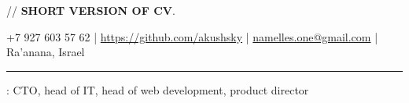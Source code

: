 \documentclass[11pt]{article}
\newif\ifdetailed
\begin{document}
%
\ifdetailed
{\small{// {\textbf{DETAILED VERSION OF CV}}. }}
\else
{\small{// {\textbf{SHORT VERSION OF CV}}. }}
\fi

\vspace{0.5em}

\noindent +7 927 603 57 62    |    \url{https://github.com/akushsky}   |   \href{mailto:namelles.one@gmail.com}{namelles.one@gmail.com}  |  Ra'anana, Israel  \ifdetailed | May 27, 1988 \fi

\vspace{0.5em}

\hrule

\vspace{1.5em}

\ifdetailed
\noindent {\textbf{CAREER OBJECTIVE}}: To work in a dynamic/established company in IT related role (IT director, CTO, IT{}manager, project manager, solution architect, development manager, or functional/technical/pre-sales consultant) on consulting, development, or operations. Preferably working in Web, e-commerce, retail, but open to other industry, challenge and opportunities.
\else
{}: CTO, head of IT, head of web development, product director
\fi

\vspace{1em}
\end{document}

